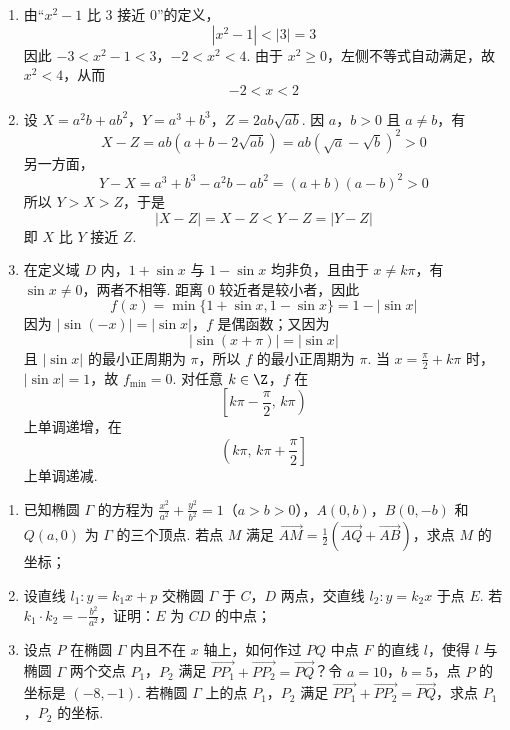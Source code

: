 \begin{solution}
\begin{enumerate}
\item 由“\(x^2-1\) 比 \(3\) 接近 \(0\)”的定义，
\[
|x^2-1|<|3|=3
\]
因此
\(-3<x^2-1<3\)，\(-2<x^2<4\).
由于 \(x^2\geqslant0\)，左侧不等式自动满足，故 \(x^2<4\)，从而
\[
-2<x<2
\]
\item 设
\(X=a^2b+ab^2\)，\(Y=a^3+b^3\)，\(Z=2ab\sqrt{ab}\).
因 \(a\)，\(b>0\) 且 \(a\ne b\)，有
\[
X-Z=ab(a+b-2\sqrt{ab})
=ab(\sqrt a-\sqrt b)^2>0
\]
另一方面，
\[
Y-X=a^3+b^3-a^2b-ab^2
=(a+b)(a-b)^2>0
\]
所以 \(Y>X>Z\)，于是
\[
|X-Z|=X-Z<Y-Z=|Y-Z|
\]
即 \(X\) 比 \(Y\) 接近 \(Z\).
\item 在定义域 \(D\) 内，\(1+\sin x\) 与 \(1-\sin x\) 均非负，且由于 \(x\ne k\pi\)，有 \(\sin x\ne0\)，两者不相等. 距离 \(0\) 较近者是较小者，因此
\[
f(x)=\min\{1+\sin x,1-\sin x\}=1-|\sin x|
\]
因为 \(|\sin(-x)|=|\sin x|\)，\(f\) 是偶函数；又因为
\[
|\sin(x+\pi)|=|\sin x|
\]
且 \(|\sin x|\) 的最小正周期为 \(\pi\)，所以 \(f\) 的最小正周期为 \(\pi\). 当 \(x=\frac{\pi}{2}+k\pi\) 时，\(|\sin x|=1\)，故 \(f_{\min}=0\).
对任意 \(k\in\Z\)，\(f\) 在
\[
\left[k\pi-\frac{\pi}{2},\,k\pi\right)
\]
上单调递增，在
\[
\left(k\pi,\,k\pi+\frac{\pi}{2}\right]
\]
上单调递减.
\end{enumerate}
\end{solution}

\begin{problem}
\begin{enumerate}
\item 已知椭圆 \(\Gamma\) 的方程为 \(\frac{x^2}{a^2} + \frac{y^2}{b^2} = 1\)（\(a > b > 0\)），\(A(0, b)\)，\(B(0, -b)\) 和 \(Q(a, 0)\) 为 \(\Gamma\) 的三个顶点. 若点 \(M\) 满足 \(\overrightarrow{AM} = \frac{1}{2}\left(\overrightarrow{AQ} + \overrightarrow{AB}\right)\)，求点 \(M\) 的坐标；
\item 设直线 \(l_{1}: y = k_{1}x + p\) 交椭圆 \(\Gamma\) 于 \(C\)，\(D\) 两点，交直线 \(l_{2}: y = k_{2}x\) 于点 \(E\). 若 \(k_{1} \cdot k_{2} = -\frac{b^{2}}{a^{2}}\)，证明：\(E\) 为 \(CD\) 的中点；
\item 设点 \(P\) 在椭圆 \(\Gamma\) 内且不在 \(x\) 轴上，如何作过 \(PQ\) 中点 \(F\) 的直线 \(l\)，使得 \(l\) 与椭圆 \(\Gamma\) 两个交点 \(P_{1}\)，\(P_{2}\) 满足 \(\overrightarrow{PP_{1}} + \overrightarrow{PP_{2}} = \overrightarrow{PQ}\)？令 \(a = 10\)，\(b = 5\)，点 \(P\) 的坐标是 \((-8, -1)\). 若椭圆 \(\Gamma\) 上的点 \(P_{1}\)，\(P_{2}\) 满足 \(\overrightarrow{PP_{1}} + \overrightarrow{PP_{2}} = \overrightarrow{PQ}\)，求点 \(P_{1}\)，\(P_{2}\) 的坐标.
\end{enumerate}
\end{problem}

